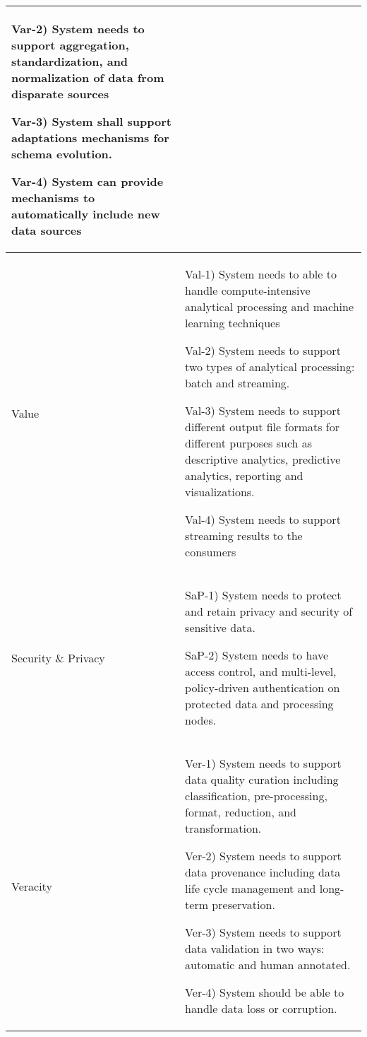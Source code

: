 \documentclass[conference]{IEEEtran}
\begin{document}
\begin{center}
\begin{table*}
\begin{tabular}{ | m{1.2cm} | m{14cm} |}
        Var-2) System needs to support aggregation, standardization, and normalization of data from disparate sources 

        Var-3) System shall support adaptations mechanisms for schema evolution.

        Var-4) System can provide mechanisms to automatically include new data sources 

        \\

        \hline

        Value & 
        
        Val-1) System needs to able to handle compute-intensive analytical processing and machine learning techniques 
        
        Val-2) System needs to support two types of analytical processing: batch and streaming. 

        Val-3) System needs to support different output file formats for different purposes such as descriptive analytics, predictive analytics, reporting and visualizations. 
        
        Val-4) System needs to support streaming results to the consumers 

        \\

        \hline

        Security \& Privacy & 
        
        SaP-1) System needs to protect and retain privacy and security of sensitive data.

        SaP-2) System needs to have access control, and multi-level, policy-driven authentication on protected data and processing nodes. 

        \\

        \hline
        
        Veracity &
        
        Ver-1) System needs to support data quality curation including classification, pre-processing, format, reduction, and  transformation. 
        
        Ver-2) System needs to support data provenance including data life cycle management and long-term preservation.
        
        Ver-3) System needs to support data validation in two ways: automatic and human annotated. 

        Ver-4) System should be able to handle data loss or corruption. 
        
        \\

        \hline
  
    \end{tabular}
    \end{table*}
\end{center}
\end{document}
